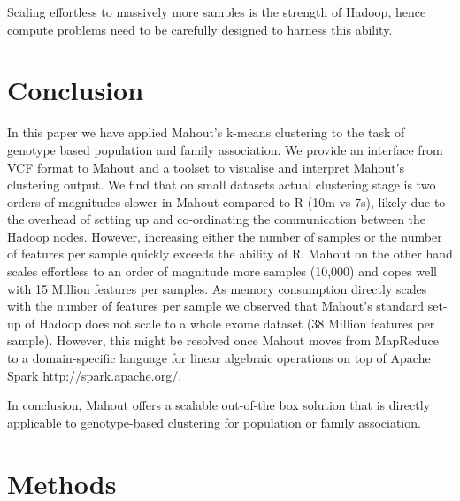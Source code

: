 \documentclass[twocolumn]{bmcart}%
\begin{document}
Scaling effortless to massively more samples is the strength of Hadoop, hence compute problems need to be carefully designed to harness this ability.  



\section*{Conclusion}
In this paper we have applied Mahout's k-means clustering to the task of genotype based population and family association. 
We provide an interface from VCF format to Mahout and a toolset to visualise and interpret Mahout's clustering output. 
We find that on small datasets actual clustering stage is two orders of magnitudes slower in Mahout compared to R (10m vs 7s), likely due to the overhead of setting up and co-ordinating the communication between the Hadoop nodes. 
However, increasing either the number of samples or the number of features per sample quickly exceeds the ability of R.
Mahout on the other hand scales effortless to an order of magnitude more samples (10,000) and copes well with 15 Million features per samples.
As memory consumption directly scales with the number of features per sample we observed that Mahout's standard set-up of Hadoop does not scale to a whole exome dataset (38 Million features per sample).
However, this might be resolved once Mahout moves from MapReduce to a domain-specific language for linear algebraic operations on top of Apache Spark \url{http://spark.apache.org/}.

In conclusion, Mahout offers a scalable out-of-the box solution that is directly applicable to genotype-based clustering for population or family association. 



\section*{Methods}
\end{document}
